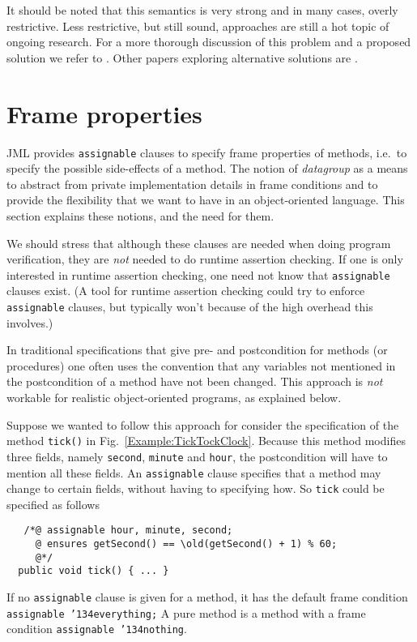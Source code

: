 \documentclass{llncs}
\def\old{\texttt{\char'134old}}
\def\everything{\texttt{\char'134everything}}
\def\nothing{\texttt{\char'134nothing}}
\begin{document}
It should be noted that this semantics is very strong and in many cases,
overly restrictive.  Less restrictive, but still sound, approaches are still a
hot topic of ongoing research. For a more thorough discussion of this problem
and a proposed solution we refer to \cite{Mueller-Poetzsch-Heffter-Leavens05}.
Other papers exploring alternative solutions are
\cite{Huizing-Kuiper00,JacobsLeinoPiessensSchulte05,Middelkoop05}.

\section{Frame properties}
\label{Sec:assignable}


JML provides \texttt{assignable} clauses to specify frame properties
of methods, i.e.\ to specify the possible side-effects of a method.
The notion of \emph{datagroup} as a means to abstract from private implementation 
details in frame conditions and to provide the flexibility that we want
to have in an object-oriented language.
This section explains these notions, and the need for them.

We should stress that although these clauses are needed when doing
program verification, they are \emph{not} needed to do runtime assertion checking. 
If one is only interested in runtime assertion checking, one need not know 
that \texttt{assignable} clauses exist.
(A tool for runtime assertion checking could try to enforce \texttt{assignable} 
clauses, but typically won't because of the high overhead this involves.)

\smallskip

In traditional specifications that give pre- and postcondition for methods
(or procedures) one often uses the convention that any variables not mentioned 
in the postcondition of a method have not been changed.  This approach is 
\emph{not} workable for realistic object-oriented programs, as explained below.

Suppose we wanted to follow this approach for consider the specification 
of the method \texttt{tick()} in Fig.~\ref{Example:TickTockClock}.
Because this method modifies three fields, namely
\texttt{second}, \texttt{minute} and \texttt{hour}, 
the postcondition will have to mention all these fields.
An  \texttt{assignable} clause specifies that a method may change to certain 
fields, without having to specifying how.
So \texttt{tick} could be specified as follows
\begin{verbatim}
   /*@ assignable hour, minute, second;
     @ ensures getSecond() == \old(getSecond() + 1) % 60;
     @*/
  public void tick() { ... }
\end{verbatim}
If no \texttt{assignable} clause is given for a method, it has the
default frame condition \texttt{assignable \everything;}
A pure method is a method with a frame condition \texttt{assignable \nothing}.
\end{document}
